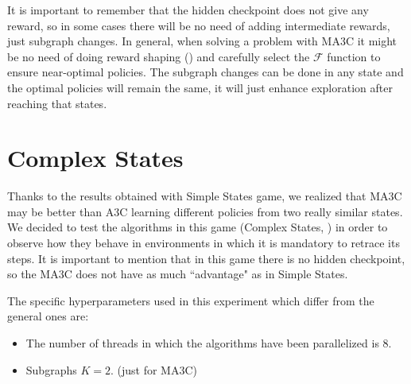 It is important to remember that the hidden checkpoint does not give any reward, so in some cases there will be no need
of adding intermediate rewards, just subgraph changes.
In general, when solving a problem with \ac{MA3C} it might be no need of doing reward shaping ()
and carefully select the $\mathcal{F}$ function to ensure near-optimal policies.
The subgraph changes can be done in any state and the optimal policies will remain the same, it will just enhance exploration
after reaching that states.

\section{Complex States}

Thanks to the results obtained with Simple States game, we realized that \ac{MA3C} may be better than \ac{A3C} learning
different policies from two really similar states.
We decided to test the algorithms in this game (Complex States, ) in order to observe how they
behave in environments in which it is mandatory to retrace its steps.
It is important to mention that in this game there is no hidden checkpoint, so the \ac{MA3C} does not have as much
``advantage" as in Simple States.

The specific hyperparameters used in this experiment which differ from the general ones are:
\begin{itemize}
    \item The number of threads in which the algorithms have been parallelized is $8$.
    \item Subgraphs $K = 2$. (just for \ac{MA3C})
\end{itemize}

